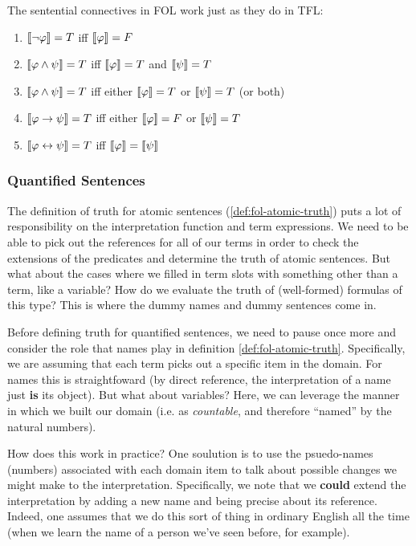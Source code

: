 \begin{definition}
  \label{def:fol-connective-truth}
  The sentential connectives in FOL work just as they do in TFL:\\
  \begin{enumerate}
  \item $\llbracket\neg\varphi\rrbracket=T$ iff $\llbracket\varphi\rrbracket=F$ 
  \item $\llbracket\varphi\wedge\psi\rrbracket=T$ iff $\llbracket\varphi\rrbracket=T$ and
    $\llbracket\psi\rrbracket=T$    
  \item $\llbracket\varphi\wedge\psi\rrbracket=T$ iff either $\llbracket\varphi\rrbracket=T$ or
    $\llbracket\psi\rrbracket=T$ (or both)
  \item $\llbracket\varphi\rightarrow\psi\rrbracket=T$ iff either $\llbracket\varphi\rrbracket=F$
    or $\llbracket\psi\rrbracket=T$
  \item $\llbracket\varphi\leftrightarrow\psi\rrbracket=T$ iff $\llbracket\varphi\rrbracket=\llbracket\psi\rrbracket$
  \end{enumerate}  
\end{definition}

\subsubsection{Quantified Sentences}

The definition of truth for atomic sentences (\ref{def:fol-atomic-truth}) puts
a lot of responsibility on the interpretation function and term expressions. We
need to be able to pick out the references for all of our terms in order to
check the extensions of the predicates and determine the truth of atomic
sentences. But what about the cases where we filled in term slots with something
other than a term, like a variable? How do we evaluate the truth of
(well-formed) formulas of this type? This is where the dummy names and dummy
sentences come in.

Before defining truth for quantified sentences, we need to pause once
more and consider the role that names play in definition
\ref{def:fol-atomic-truth}. Specifically, we are assuming that each term
picks out a specific item in the domain. For names this is straightfoward (by
direct reference, the interpretation of a name just \textbf{is} its object). But
what about variables? Here, we can leverage the manner in which we built our
domain (i.e. as \emph{countable}, and therefore ``named'' by the natural
numbers).

How does this work in practice? One soulution is to use the psuedo-names
(numbers) associated with each domain item to talk about possible changes we
might make to the interpretation. Specifically, we note that we \textbf{could}
extend the interpretation by adding a new name and being precise about its
reference. Indeed, one assumes that we do this sort of thing in ordinary English
all the time (when we learn the name of a person we've seen before, for
example).

